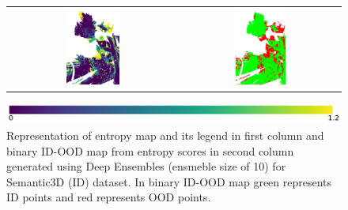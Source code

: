 \begin{figure}[h!]
\begin{tabular}{cc}
            \includegraphics[width=0.33\textwidth, height=0.18\textheight]{images/ood_imgs/de_sem3d/de_ent_10_3.pdf}& 
            \includegraphics[width=0.33\textwidth, height=0.18\textheight]{images/ood_imgs/de_sem3d/de_ent_ood_auroc_3.pdf}\\
        \end{tabular}
        \includegraphics[scale=0.45]{images/ent_legend.pdf}
        \caption{Representation of entropy map and its legend in first column and binary ID-OOD map from entropy scores in second column generated using Deep Ensembles (ensmeble size of 10) for Semantic3D (ID) dataset. In binary ID-OOD map green represents ID points and red represents OOD points.}
        \label{fig:de_ood_auroc_sem3d_ent}
    \end{figure}
